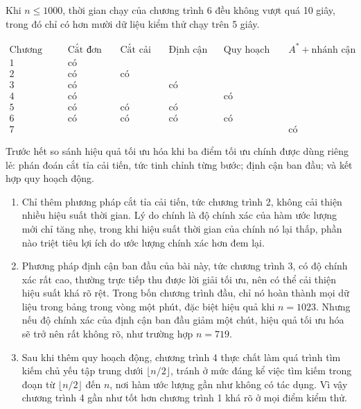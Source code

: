 \documentclass[11pt]{article}
\begin{document}
Khi \(n\le 1000\), thời gian chạy của chương trình 6 đều không vượt quá
10 giây, trong đó chỉ có hơn mười dữ liệu kiểm thử chạy trên 5 giây.

\[
\begin{array}{c|c|c|c|c|c}
\text{Chương trình} & \text{Cắt đơn giản} & \text{Cắt cải tiến} &
\text{Định cận đầu} & \text{Quy hoạch động} & A^\ast+\text{nhánh cận}\\
\hline
1 & \text{có} & & & &\\
2 & \text{có} & \text{có} & & &\\
3 & \text{có} & & \text{có} & &\\
4 & \text{có} & & & \text{có} &\\
5 & \text{có} & \text{có} & \text{có} & &\\
6 & \text{có} & \text{có} & \text{có} & \text{có} &\\
7 & & & & & \text{có}
\end{array}
\]

Trước hết so sánh hiệu quả tối ưu hóa khi ba điểm tối ưu chính được dùng
riêng lẻ: phán đoán cắt tỉa cải tiến, tức tinh chỉnh từng bước; định cận ban
đầu; và kết hợp quy hoạch động.

\begin{enumerate}
  \item Chỉ thêm phương pháp cắt tỉa cải tiến, tức chương trình 2, không cải
  thiện nhiều hiệu suất thời gian. Lý do chính là độ chính xác của hàm ước
  lượng mới chỉ tăng nhẹ, trong khi hiệu suất thời gian của chính nó lại
  thấp, phần nào triệt tiêu lợi ích do ước lượng chính xác hơn đem lại.

  \item Phương pháp định cận ban đầu của bài này, tức chương trình 3, có độ
  chính xác rất cao, thường trực tiếp thu được lời giải tối ưu, nên có thể
  cải thiện hiệu suất khá rõ rệt. Trong bốn chương trình đầu, chỉ nó hoàn
  thành mọi dữ liệu trong bảng trong vòng một phút, đặc biệt hiệu quả khi
  \(n=1023\). Nhưng nếu độ chính xác của định cận ban đầu giảm một chút, hiệu
  quả tối ưu hóa sẽ trở nên rất không rõ, như trường hợp \(n=719\).

  \item Sau khi thêm quy hoạch động, chương trình 4 thực chất làm quá trình
  tìm kiếm chủ yếu tập trung dưới \(\lfloor n/2\rfloor\), tránh ở mức đáng kể
  việc tìm kiếm trong đoạn từ \(\lfloor n/2\rfloor\) đến \(n\), nơi hàm ước
  lượng gần như không có tác dụng. Vì vậy chương trình 4 gần như tốt hơn
  chương trình 1 khá rõ ở mọi điểm kiểm thử.
\end{enumerate}
\end{document}
